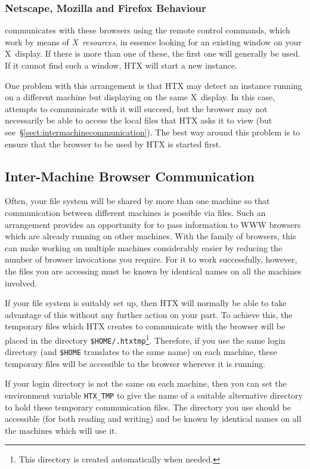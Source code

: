 \documentclass[11pt,nolof]{starlink}
\providecommand{\netscapeurl}{http://home.netscape.com/}
\providecommand{\netscaperef}[1]{\htmladdnormallink{#1}{\netscapeurl}}
\providecommand{\hi}[1]{{\texttt{#1}}}
\providecommand{\st}[1]{{\emph{#1}}}
\begin{document}
\subsubsection{Netscape, Mozilla and Firefox Behaviour}

 communicates with these browsers using
the remote control commands, which work by means of \st{X~resources}, in
essence looking for an existing window on your X~display. If there is more
than one of these, the first one will generally be used. If it cannot find
such a window, HTX will start a new instance.

One problem with this arrangement is that HTX may detect an instance running
on a different machine but displaying on the same X~display. In this case,
attempts to communicate with it will succeed, but the browser may not
necessarily be able to access the local files that HTX asks it to view (but
see~\S\ref{sect:intermachinecommunication}). The best way around this problem
is to ensure that the browser to be used by HTX is started first.

\subsection{\label{sect:intermachinecommunication}Inter-Machine Browser Communication}

Often, your file system will be shared by more than one machine so
that communication between different machines is possible via
files. Such an arrangement provides an opportunity for
 to pass information to WWW browsers which are
already running on other machines. With the
\netscaperef{\st{Netscape}} family of browsers, this can make working on
multiple machines considerably easier by reducing the number of browser
invocations you require. For it to work successfully, however, the
files you are accessing must be known by identical names on all the
machines involved.

If your file system is suitably set up, then HTX will normally be able
to take advantage of this without any further action on your part. To
achieve this, the temporary files which HTX creates to communicate
with the browser will be placed in the directory
\hi{\$HOME/.htxtmp}\footnote{This directory is created automatically
when needed.}. Therefore, if you use the same login directory (and
\hi{\$HOME} translates to the same name) on each machine, these
temporary files will be accessible to the browser wherever it is
running.

If your login directory is not the same on each machine, then you can
set the environment variable \hi{HTX\_TMP} to give the name of a
suitable alternative directory to hold these temporary communication
files. The directory you use should be accessible (for both reading
and writing) and be known by identical names on all the machines which
will use it.
\end{document}
